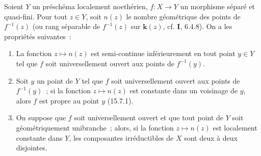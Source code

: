 \begin{proposition}[15.5.1]
\label{IV.15.5.1-fr}
Soient $Y$ un préschéma localement noethérien, $f:X\to Y$ un morphisme séparé et quasi-fini. Pour tout $z\in Y$, soit $n(z)$ le nombre géométrique des points de $f^{-1}(z)$ (ou rang séparable de $f^{-1}(z)$ sur $\mathbf{k}(z)$, cf. \textbf{I}, 6.4.8). On a les propriétés suivantes~:
\begin{enumerate}[label=\emph{(\roman*)}]
  \item La fonction $z\mapsto n(z)$ est semi-continue inférieurement en tout point $y\in Y$ tel que $f$ soit universellement ouvert aux points de $f^{-1}(y)$.
  \item Soit $y$ un point de $Y$ tel que $f$ soit universellement ouvert aux points de $f^{-1}(y)$~; si la fonction $z\mapsto n(z)$ est constante dans un voisinage de $y$, alors $f$ est propre au point $y$ (15.7.1).
  \item On suppose que $f$ soit universellement ouvert et que tout point de $Y$ soit géométriquement unibranche~; alors, si la fonction $z\mapsto n(z)$ est localement constante dans $Y$, les composantes irréductibles de $X$ sont deux à deux disjointes.
\end{enumerate}
\end{proposition}

